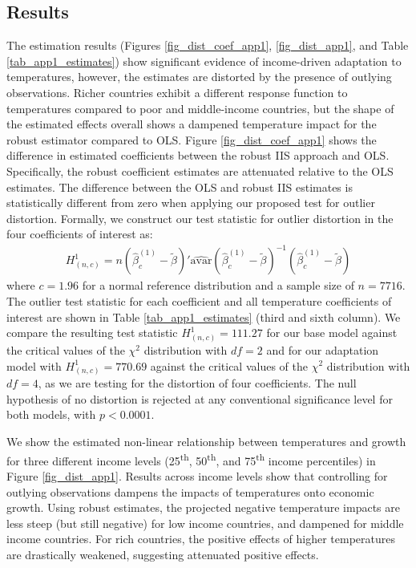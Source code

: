 \documentclass[11pt, letterpaper]{article}
\numberwithin{algorithm}{section}
\numberwithin{assumption}{section}
\numberwithin{lemma}{section}
\numberwithin{theorem}{section}
\numberwithin{corollary}{section}
\numberwithin{remark}{section}
\numberwithin{equation}{section}
\numberwithin{figure}{section}
\numberwithin{table}{section}
\begin{document}
\subsection{Results}
The estimation results (Figures \ref{fig_dist_coef_app1}, \ref{fig_dist_app1}, and Table \ref{tab_app1_estimates}) show significant evidence of income-driven adaptation to temperatures, however, the estimates are  distorted by the presence of outlying observations. Richer countries exhibit a different response function to temperatures compared to poor and middle-income countries, but the shape of the estimated effects overall shows a dampened temperature impact for the robust estimator compared to OLS. Figure \ref{fig_dist_coef_app1} shows the difference in estimated coefficients between the robust IIS approach and OLS. Specifically, the robust coefficient estimates are attenuated relative to the OLS estimates. The difference between the OLS and robust IIS estimates is statistically different from zero when applying our proposed test for outlier distortion. Formally, we construct our test statistic for outlier distortion in the four coefficients of interest as:
\begin{eqnarray}
H^{1}_{(n,c)} = n \left( \hat{\beta}^{( 1)}_{c} - \tilde{\beta} \right)'\widehat{\mbox{avar}}\left( \hat{\beta}^{( 1)}_{c} - \tilde{\beta} \right)^{-1}\left( \hat{\beta}^{( 1)}_{c} - \tilde{\beta} \right)
\end{eqnarray}
where $c=1.96$ for a normal reference distribution and a sample size of $n=7716$. The outlier test statistic for each coefficient and all temperature coefficients of interest are shown in Table \ref{tab_app1_estimates} (third and sixth column). We compare the resulting test statistic $H^{1}_{(n,c)} = 111.27$ for our base model against the critical values of the $\chi^{2}$ distribution with $df=2$ and for our adaptation model with $H^{1}_{(n,c)} = 770.69$ against the critical values of the $\chi^{2}$ distribution with $df=4$, as we are testing for the distortion of four coefficients. The null hypothesis of no distortion is rejected at any conventional significance level for both models, with $p<0.0001$.

We show the estimated non-linear relationship between temperatures and growth for three different income levels (25\textsuperscript{th}, 50\textsuperscript{th}, and 75\textsuperscript{th} income percentiles) in Figure \ref{fig_dist_app1}. Results across income levels show that controlling for outlying observations dampens the impacts of temperatures onto economic growth. Using robust estimates, the projected negative temperature impacts are less steep (but still negative) for low income countries, and dampened for middle income countries. For rich countries, the positive effects of higher temperatures are drastically weakened, suggesting attenuated positive effects.
\end{document}
